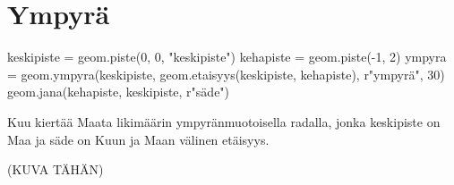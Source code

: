 \section*{Ympyrä}


\begin{kuva}
keskipiste = geom.piste(0, 0, "keskipiste")
kehapiste = geom.piste(-1, 2)
ympyra = geom.ympyra(keskipiste, geom.etaisyys(keskipiste, kehapiste), r"ympyr\"{a}", 30)
geom.jana(kehapiste, keskipiste, r"s\"{a}de")
\end{kuva}

\begin{esimerkki}
Kuu kiertää Maata likimäärin ympyränmuotoisella radalla, jonka keskipiste on Maa ja säde on Kuun ja Maan välinen etäisyys.
\end{esimerkki}

(KUVA TÄHÄN)

\laatikko{

}